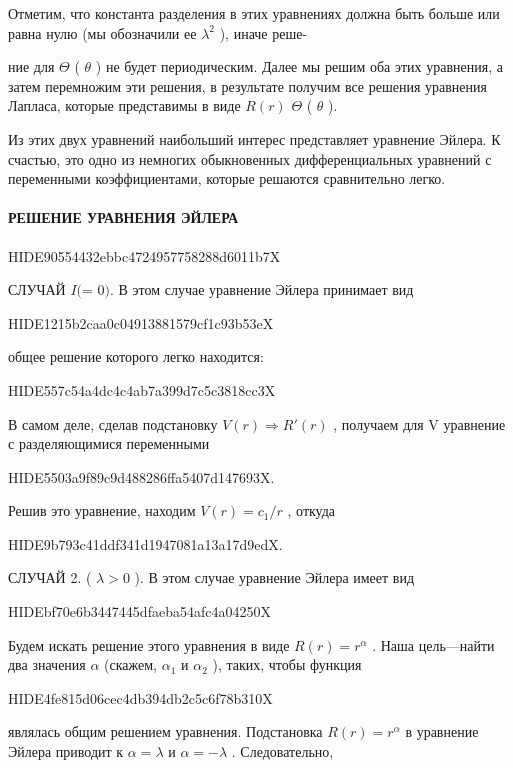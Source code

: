 \documentclass[
  ukrainian,
]{article}
\begin{document}
Отметим, что константа разделения в этих уравнениях должна быть больше
или равна нулю (мы обозначили ее \(\lambda^2\) ), иначе реше-

ние для \(\Theta\) ( \(\theta\) ) не будет периодическим. Далее мы решим
оба этих уравнения, а затем перемножим эти решения, в результате получим
все решения уравнения Лапласа, которые представимы в виде \(R (r)\)
\(\Theta\) ( \(\theta\) ).

Из этих двух уравнений наибольший интерес представляет уравнение Эйлера.
К счастью, это одно из немногих обыкновенных дифференциальных уравнений
с переменными коэффициентами, которые решаются сравнительно легко.

\paragraph{РЕШЕНИЕ УРАВНЕНИЯ
ЭЙЛЕРА}\label{ux440ux435ux448ux435ux43dux438ux435-ux443ux440ux430ux432ux43dux435ux43dux438ux44f-ux44dux439ux43bux435ux440ux430}

HIDE90554432ebbc4724957758288d6011b7X

СЛУЧАЙ \(I (\)\lambda = 0\()\). В этом случае уравнение Эйлера принимает
вид

HIDE1215b2caa0c04913881579cf1c93b53eX

общее решение которого легко находится:

HIDE557c54a4dc4c4ab7a399d7c5c3818cc3X

В самом деле, сделав подстановку
\(V\left(r\right) \Rightarrow R'\left(r\right)\) , получаем для V
уравнение с разделяющимися переменными

HIDE5503a9f89c9d488286ffa5407d147693X.

Решив это уравнение, находим \(V\left(r\right)=c_{1}/r\) , откуда

HIDE9b793c41ddf341d1947081a13a17d9edX.

СЛУЧАЙ 2. ( \(\lambda > 0\) ). В этом случае уравнение Эйлера имеет вид

HIDEbf70e6b3447445dfaeba54afc4a04250X

Будем искать решение этого уравнения в виде \(R(r)=r^{\alpha}\) . Наша
цель---найти два значения \(\alpha\) (скажем, \(\alpha_1\) и
\(\alpha_2\) ), таких, чтобы функция

HIDE4fe815d06cec4db394db2c5c6f78b310X

являлась общим решением уравнения. Подстановка \(R(r) = r^{\alpha}\) в
уравнение Эйлера приводит к \(\alpha = \lambda\) и \(\alpha = -\lambda\)
. Следовательно,
\end{document}
